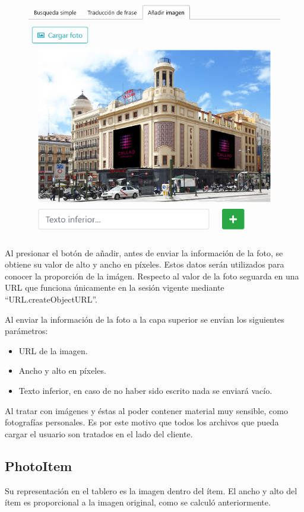 \begin{figure}[h!]
	\centering
	\includegraphics[width=0.7\linewidth]{Imagenes/Bitmap/addPhotoItem}
	\caption{}
	\label{fig:addphotoitem}
\end{figure}



Al presionar el botón de añadir, antes de enviar la información de la foto, se obtiene su valor de alto y ancho en píxeles. Estos datos serán utilizados para conocer la proporción de la imágen. Respecto al valor de la foto seguarda en una URL que funciona únicamente en la sesión vigente mediante  “URL.createObjectURL”.

Al enviar la información de la foto a la capa superior se envían los siguientes parámetros: 

\begin{itemize}
	\item URL de la imagen.
	\item Ancho y alto en píxeles.
	\item Texto inferior, en caso de no haber sido escrito nada se enviará vacío.
\end{itemize}



Al tratar con imágenes y éstas al poder contener material muy sensible, como fotografías personales. Es por este motivo que todos los archivos que pueda cargar el usuario son tratados en el lado del cliente. 

\subsection{PhotoItem}

Su representación en el tablero es la imagen dentro del ítem. El ancho y alto del ítem es proporcional a la imagen original, como se calculó anteriormente. 

